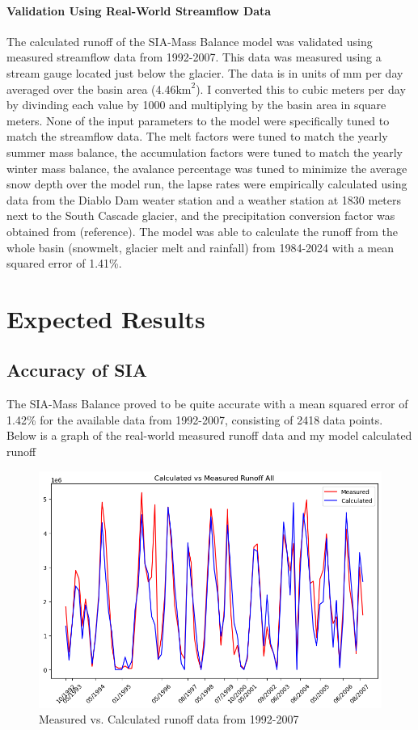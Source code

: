 \documentclass{article}
\begin{document}
\paragraph{Validation Using Real-World Streamflow Data }

The calculated runoff of the SIA-Mass Balance model was validated using measured streamflow data from 1992-2007. This data was measured using 
a stream gauge located just below the glacier. The data is in units of mm per day averaged over the basin area (4.46$\text{km}^2$). I 
converted this to cubic meters per day by divinding each value by 1000 and multiplying by the basin area in square meters. None of the input 
parameters to the model were specifically tuned to match the streamflow data. The melt factors were tuned to match the yearly summer mass 
balance, the accumulation factors were tuned to match the yearly winter mass balance, the avalance percentage was tuned to minimize the 
average snow depth over the model run, the lapse rates were empirically calculated using data from the Diablo Dam weater station and a weather station 
at 1830 meters next to the South Cascade glacier, and the precipitation conversion factor was obtained from (reference). The model was able 
to calculate the runoff from the whole basin (snowmelt, glacier melt and rainfall) from 1984-2024 with a mean squared error of 1.41\%.

\section{Expected Results}
\subsection{Accuracy of SIA}
The SIA-Mass Balance proved to be quite accurate with a mean squared error of 1.42\% for the available data from 1992-2007, consisting of 2418 
data points. Below is a graph of the real-world measured runoff data and my model calculated runoff
\begin{figure}[h!]
    \centering
    \includegraphics[width=\textwidth]{Plots/calc_vs_measured.png}
    \caption{Measured vs. Calculated runoff data from 1992-2007}
    \label{fig:calc_vs_measured}
\end{figure}
\FloatBarrier
\end{document}
